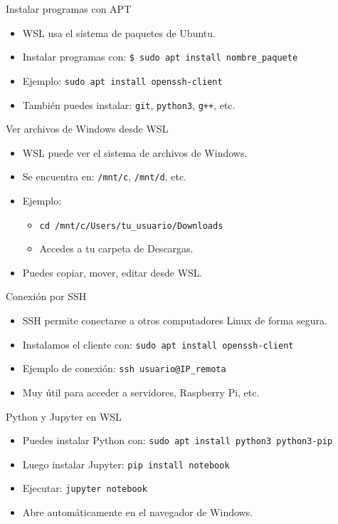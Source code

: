 \documentclass[aspectratio=169,professionalfonts]{beamer}
\begin{document}
\begin{frame}{Instalar programas con APT}
  \begin{itemize}
    \item WSL usa el sistema de paquetes de Ubuntu.
    \item Instalar programas con:
      \texttt{\$ sudo apt install nombre\_paquete}
    \item Ejemplo: \texttt{sudo apt install openssh-client}
    \item También puedes instalar: \texttt{git}, \texttt{python3}, \texttt{g++}, etc.
  \end{itemize}
\end{frame}

\begin{frame}{Ver archivos de Windows desde WSL}
  \begin{itemize}
    \item WSL puede ver el sistema de archivos de Windows.
    \item Se encuentra en: \texttt{/mnt/c}, \texttt{/mnt/d}, etc.
    \item Ejemplo:
      \begin{itemize}
        \item \texttt{cd /mnt/c/Users/tu\_usuario/Downloads}
        \item Accedes a tu carpeta de Descargas.
      \end{itemize}
    \item Puedes copiar, mover, editar desde WSL.
  \end{itemize}
\end{frame}

\begin{frame}{Conexión por SSH}
  \begin{itemize}
    \item SSH permite conectarse a otros computadores Linux de forma segura.
    \item Instalamos el cliente con:
      \texttt{sudo apt install openssh-client}
    \item Ejemplo de conexión:
      \texttt{ssh usuario@IP\_remota}
    \item Muy útil para acceder a servidores, Raspberry Pi, etc.
  \end{itemize}
\end{frame}


\begin{frame}{Python y Jupyter en WSL}
  \begin{itemize}
    \item Puedes instalar Python con:
      \texttt{sudo apt install python3 python3-pip}
    \item Luego instalar Jupyter:
      \texttt{pip install notebook}
    \item Ejecutar: \texttt{jupyter notebook}
    \item Abre automáticamente en el navegador de Windows.
  \end{itemize}
\end{frame}
\end{document}
